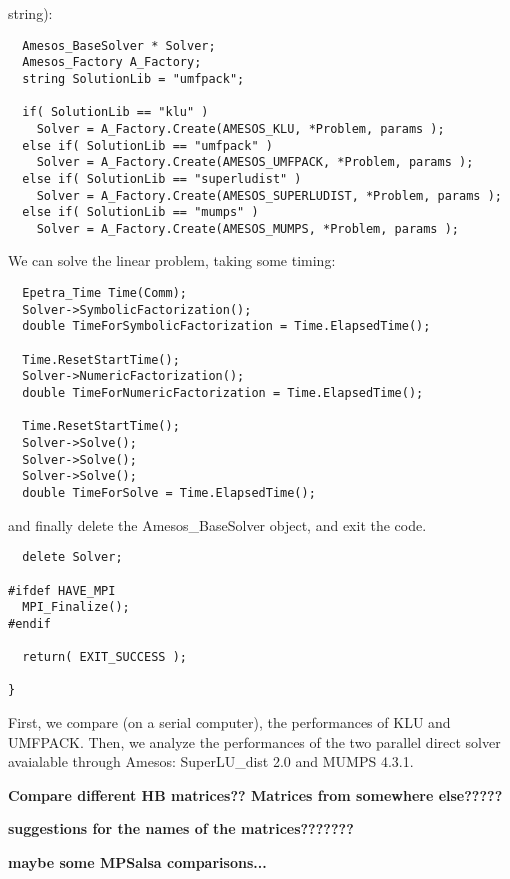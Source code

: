 \documentclass[11pt,letter]{article}
\begin{document}
string):
\begin{verbatim}  
  Amesos_BaseSolver * Solver;
  Amesos_Factory A_Factory;
  string SolutionLib = "umfpack";

  if( SolutionLib == "klu" ) 
    Solver = A_Factory.Create(AMESOS_KLU, *Problem, params );
  else if( SolutionLib == "umfpack" )
    Solver = A_Factory.Create(AMESOS_UMFPACK, *Problem, params );
  else if( SolutionLib == "superludist" )
    Solver = A_Factory.Create(AMESOS_SUPERLUDIST, *Problem, params );
  else if( SolutionLib == "mumps" )
    Solver = A_Factory.Create(AMESOS_MUMPS, *Problem, params );
\end{verbatim}
We can solve the linear problem, taking some timing:
\begin{verbatim}  
  Epetra_Time Time(Comm);      
  Solver->SymbolicFactorization();
  double TimeForSymbolicFactorization = Time.ElapsedTime();
  
  Time.ResetStartTime();  
  Solver->NumericFactorization();
  double TimeForNumericFactorization = Time.ElapsedTime();
   
  Time.ResetStartTime();
  Solver->Solve();
  Solver->Solve();
  Solver->Solve();
  double TimeForSolve = Time.ElapsedTime();
\end{verbatim}
and finally delete the Amesos\_BaseSolver object, and exit the code.

\begin{verbatim}  
  delete Solver;
    
#ifdef HAVE_MPI
  MPI_Finalize();
#endif

  return( EXIT_SUCCESS );

}
\end{verbatim}

First, we compare (on a serial computer), the performances of
KLU and UMFPACK. Then, we analyze the performances of the two parallel
direct solver avaialable through Amesos: SuperLU\_dist 2.0 and MUMPS
4.3.1.


{\bf Compare different HB matrices?? Matrices from somewhere else?????}

{\bf suggestions for the names of the matrices???????}

{\bf maybe some MPSalsa comparisons...}



\end{document}
